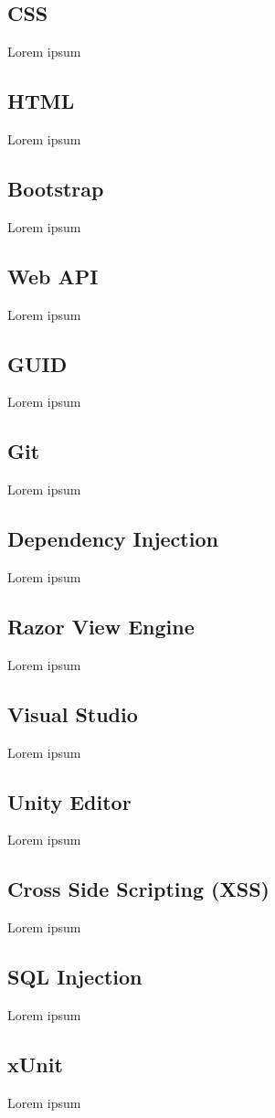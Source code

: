  \subsection*{CSS}
Lorem ipsum
\subsection*{HTML}
Lorem ipsum
\subsection*{Bootstrap}
Lorem ipsum
\subsection*{Web API}
Lorem ipsum
\subsection*{GUID}
Lorem ipsum
\subsection*{Git}
Lorem ipsum
\subsection*{Dependency Injection}
Lorem ipsum
\subsection*{Razor View Engine}
Lorem ipsum
\subsection*{Visual Studio}
Lorem ipsum
\subsection*{Unity Editor}
Lorem ipsum
\subsection*{Cross Side Scripting (XSS)}
Lorem ipsum
\subsection*{SQL Injection}
Lorem ipsum
\subsection*{xUnit}
Lorem ipsum

